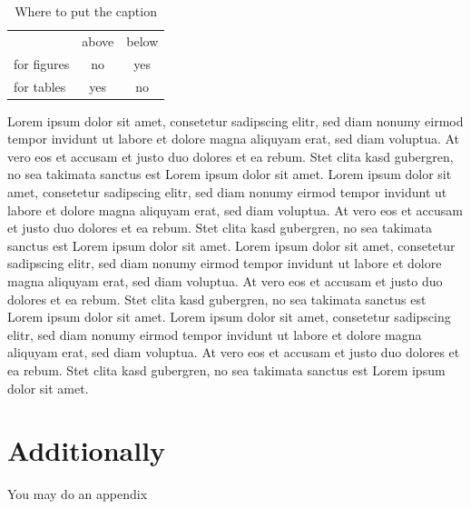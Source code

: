 \documentclass[12pt,DIV14,BCOR12mm,a4paper,footexclude,headinclude,halfparskip-,twoside,openright,openany,cleardoubleempty,idxtotoc,bibtotoc]{scrreprt} %
\def \doclang{english} 	%
\numberwithin{equation}{chapter}
\begin{document}
\begin{table}
    \centering
    \caption{Where to put the caption}
    \label{captions}
    \begin{tabular}{lcc}
         & above & below\\
        for figures & no & yes\\
        for tables & yes & no\\
    \end{tabular}
\end{table}


Lorem ipsum dolor sit amet, consetetur sadipscing elitr, sed diam nonumy eirmod tempor invidunt ut labore et dolore magna aliquyam erat, sed diam voluptua. At vero eos et accusam et justo duo dolores et ea rebum. Stet clita kasd gubergren, no sea takimata sanctus est Lorem ipsum dolor sit amet. Lorem ipsum dolor sit amet, consetetur sadipscing elitr, sed diam nonumy eirmod tempor invidunt ut labore et dolore magna aliquyam erat, sed diam voluptua. At vero eos et accusam et justo duo dolores et ea rebum. Stet clita kasd gubergren, no sea takimata sanctus est Lorem ipsum dolor sit amet.
\newpage
Lorem ipsum dolor sit amet, consetetur sadipscing elitr, sed diam nonumy eirmod tempor invidunt ut labore et dolore magna aliquyam erat, sed diam voluptua. At vero eos et accusam et justo duo dolores et ea rebum. Stet clita kasd gubergren, no sea takimata sanctus est Lorem ipsum dolor sit amet. Lorem ipsum dolor sit amet, consetetur sadipscing elitr, sed diam nonumy eirmod tempor invidunt ut labore et dolore magna aliquyam erat, sed diam voluptua. At vero eos et accusam et justo duo dolores et ea rebum. Stet clita kasd gubergren, no sea takimata sanctus est Lorem ipsum dolor sit amet.


\appendix
\chapter{Additionally}
You may do an appendix

	\ifthenelse{\equal{\doclang}{german}}{
		
	}{
		
	}
	
	
\end{document}
